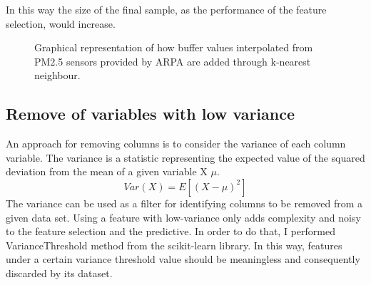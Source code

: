 In this way the size of the final sample, as the performance of the feature selection, would increase.
\begin{figure}[H] \centering
{}
 { \caption{Graphical representation of how buffer values interpolated from PM2.5 sensors provided by ARPA are added through k-nearest neighbour.}}
\end{figure}

\bigbreak
\subsection{Remove of variables with low variance}
An approach for removing columns is to consider the variance of each column variable. The variance is a statistic representing the expected value of the squared deviation from the mean of a given variable X $\mu$. 
\begin{equation}
  Var(X) = E[(X-\mu)^2]
\end{equation}
The variance can be used as a filter for identifying columns to be removed from a given data set. 
Using a feature with low-variance only adds complexity and noisy to the feature selection and the predictive.\newline
In order to do that, I performed VarianceThreshold method from the scikit-learn library. In this way, features under a certain variance threshold value should be meaningless and consequently discarded by its dataset. 
\pagebreak
